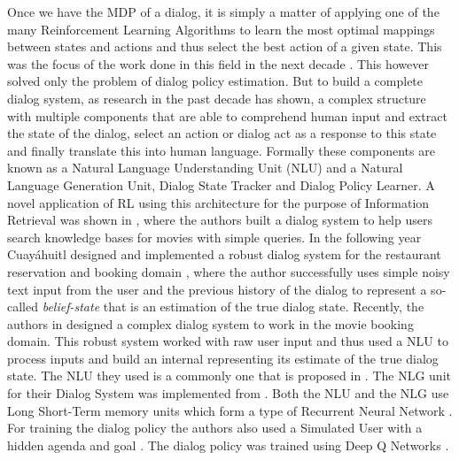 \documentclass[14pt]{extarticle}
\numberwithin{equation}{section}
\begin{document}
	Once we have the MDP of a dialog, it is simply a matter of applying one of the many Reinforcement Learning Algorithms to learn the most optimal mappings between states and actions and thus select the best action of a given state. This was the focus of the work done in this field in the next decade \cite{Young99probabilisticmethods}\cite{Singh_mdp}\cite{Pietquin_mdp}. This however solved only the problem of dialog policy estimation. But to build a complete dialog system, as research in the past decade has shown, a complex structure with multiple components that are able to comprehend human input and extract the state of the dialog, select an action or dialog act as a response to this state and finally translate this into human language. Formally these components are known as  a Natural Language Understanding Unit (NLU) and a Natural Language Generation Unit, Dialog State Tracker and Dialog Policy Learner. A novel application of RL using this architecture for the purpose of Information Retrieval was shown in \cite{Dhingra2016EndtoEndRL}, where the authors built a dialog system to help users search knowledge bases for movies with simple queries. In the following year Cuayáhuitl designed and implemented a robust dialog system for the restaurant reservation and booking domain \cite{Cuayhuitl2016SimpleDSAS}, where the author successfully uses simple noisy text input from the user and the previous history of the dialog to represent a so-called \textit{belief-state} that is an estimation of the true dialog state. Recently, the authors in \cite{Li17e2eDS} designed a complex dialog system to work in the movie booking domain. This robust system worked with raw user input and thus used a NLU to process inputs and build an internal  representing its estimate of the true dialog state. The NLU they used is a commonly one that is proposed in \cite{HakkaniTr2016NLU}. The NLG unit for their Dialog System was implemented from \cite{Wen_NLG}. Both the NLU and the NLG use Long Short-Term memory units which form a type of Recurrent Neural Network \cite{hochreiter1997long}. For training the dialog policy the authors also used a Simulated User with a hidden agenda and goal \cite{Schatzmann_agenda_sim}\cite{Li_user_sim}. The dialog policy was trained using Deep Q Networks \cite{Mnih_DQN}.
\end{document}
